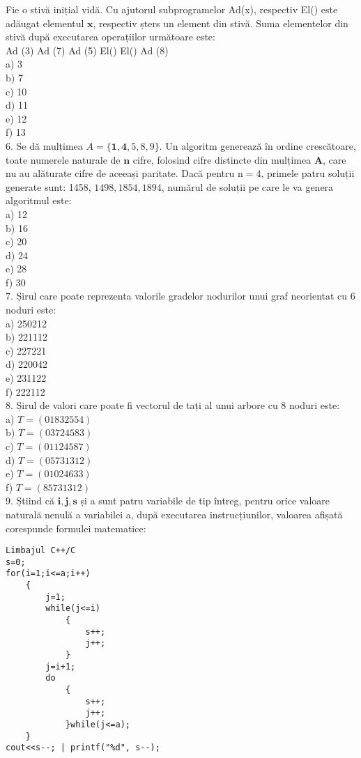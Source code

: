Fie o stivă inițial vidă. Cu ajutorul subprogramelor Ad(x), respectiv El() este adăugat elementul $\mathbf{x}$, respectiv șters un element din stivă. Suma elementelor din stivă după executarea operațiilor următoare este:\\
Ad (3) Ad (7) Ad (5) El() El() Ad (8)\\
a) 3\\
b) 7\\
c) 10\\
d) 11\\
e) 12\\
f) 13\\
6. Se dă mulțimea $A=\{\mathbf{1}, \mathbf{4}, 5,8,9\}$. Un algoritm generează în ordine crescătoare, toate numerele naturale de $\mathbf{n}$ cifre, folosind cifre distincte din mulțimea $\mathbf{A}$, care nu au alăturate cifre de aceeași paritate. Dacă pentru $\mathrm{n}=4$, primele patru soluții generate sunt: 1458, $1498,1854,1894$, numărul de soluții pe care le va genera algoritmul este:\\
a) 12\\
b) 16\\
c) 20\\
d) 24\\
e) 28\\
f) 30\\
7. Șirul care poate reprezenta valorile gradelor nodurilor unui graf neorientat cu 6 noduri este:\\
a) 250212\\
b) 221112\\
c) 227221\\
d) 220042\\
e) 231122\\
f) 222112\\
8. Șirul de valori care poate fi vectorul de tați al unui arbore cu 8 noduri este:\\
a) $T=(01832554)$\\
b) $T=(03724583)$\\
c) $T=(01124587)$\\
d) $T=(05731312)$\\
e) $T=(01024633)$\\
f) $T=(85731312)$\\
9. Știind că $\mathbf{i}, \mathbf{j}, \mathbf{s}$ și a sunt patru variabile de tip întreg, pentru orice valoare naturală nenulă a variabilei a, după executarea instrucțiunilor, valoarea afișată corespunde formulei matematice:

\begin{verbatim}
Limbajul C++/C
s=0;
for(i=1;i<=a;i++)
    {
        j=1;
        while(j<=i)
            {
                s++;
                j++;
            }
        j=i+1;
        do
            {
                s++;
                j++;
            }while(j<=a);
    }
cout<<s--; | printf("%d", s--);
\end{verbatim}

